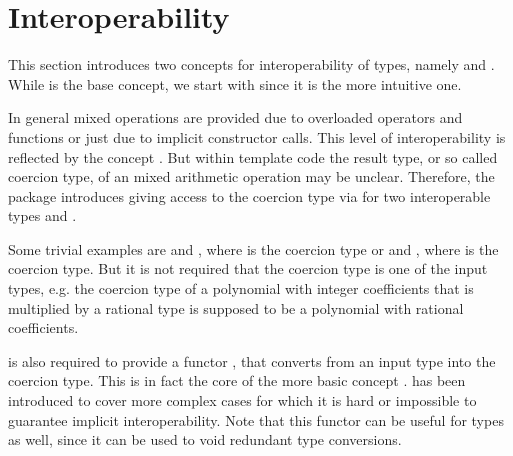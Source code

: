 \section{Interoperability}

This section introduces two concepts for interoperability of types, 
namely  and . While 
 is the base concept, we start with 
 since it is the more intuitive one.

In general mixed operations are provided due to overloaded operators and
functions or just due to implicit constructor calls. 
This level of interoperability is reflected by the concept 
. But within template code the result type, 
or so called coercion type, of an mixed arithmetic operation may be unclear.
Therefore, the package introduces 
giving access to the coercion type via 
for two interoperable types  and . 


Some trivial examples are  and , where 
is the coercion type or  and , where  is the 
coercion type. But it is not required that the coercion type is one of 
the input types, e.g. the coercion type of a polynomial 
with integer coefficients that is multiplied by a rational type 
is supposed to be a polynomial with rational coefficients.

 is also
required to provide a functor , that 
converts from an input type into the coercion type. This is in fact the core
of the more basic concept . 
 has been introduced to cover more complex cases 
for which it is hard or impossible to guarantee implicit interoperability.  
Note that this functor can be useful for  types 
as well, since it can be used to void redundant type conversions.  


